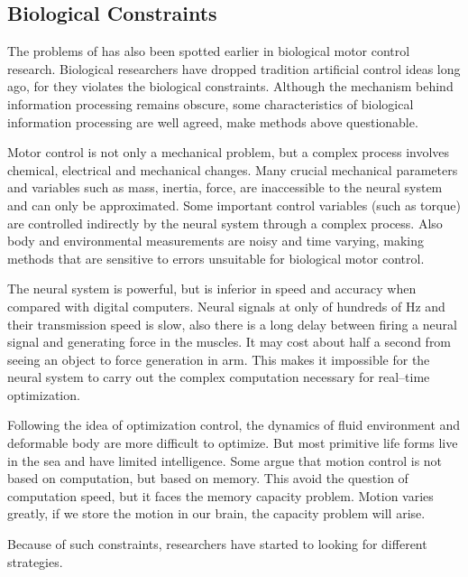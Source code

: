 \subsection{Biological Constraints}
The problems of \cms has also been spotted earlier in biological motor control research.
Biological researchers have dropped  tradition artificial control ideas long ago, for they  violates the biological constraints.
Although the mechanism behind information processing remains obscure, some characteristics of biological information processing are well agreed,  make  \cms methods above questionable\citep{Glynn2003}. 
  
\begin{itemize}
Motor control is not only a mechanical problem, but a complex process involves chemical, electrical and mechanical changes.
Many crucial mechanical parameters and variables such as mass, inertia, force, are inaccessible to the neural system and can only be approximated. 
Some important control variables (such as torque) are controlled indirectly by the neural system through a complex process.
Also body and environmental measurements are noisy and time varying, making methods that are sensitive to errors unsuitable for biological motor control.

The neural system is powerful, but is inferior in speed and accuracy when compared with digital computers. 
Neural signals at only of hundreds of Hz and their transmission speed is slow, also there is a long delay between firing a neural signal and generating force in the muscles.
It may cost about half a second from seeing an object to force generation in arm. 
This makes it impossible for the neural system to carry out the complex computation necessary for real–time optimization.


Following the idea of optimization control, the dynamics of fluid environment and deformable body are more difficult to optimize. 
But most primitive life forms live in the sea and have limited intelligence. 
Some argue that motion control is not based on computation, but based on memory.
This avoid the question of computation speed, but it faces the memory capacity problem. 
Motion varies greatly, if we store the motion in our brain, the capacity problem will arise.
\end{itemize}

Because of such constraints, researchers have started to looking for different strategies.

